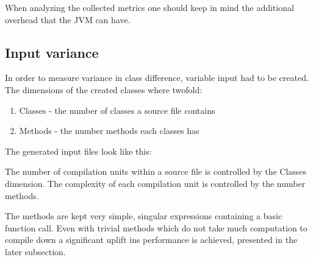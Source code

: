\documentclass{VUMIFPSbakalaurinis}
\begin{document}
When analyzing the collected metrics one should keep in mind the additional overhead that the JVM can have.

\subsection{Input variance}
In order to measure variance in class difference, variable input had to be created.
The dimensions of the created classes where twofold:

\begin{enumerate}
\item{Classes - the number of classes a source file contains}
\item{Methods - the number methods each classes has}
\end{enumerate}

The generated input files look like this:



The number of compilation units within a source file is controlled by the Classes dimension. The complexity of each compilation unit is controlled by the number methods.

The methods are kept very simple, singular expressions containing a basic function call.
Even with trivial methods which do not take much computation to compile down a significant uplift ins performance is achieved, presented in the later subsection.

\begin{center}
\begin{tabular}{ c | c | c | c | c | c }

\end{tabular}
\end{center}

\begin{figure}
\end{figure}
\end{document}

